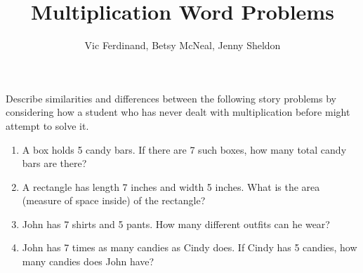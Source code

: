 \documentclass{ximera}
\title{Multiplication Word Problems}
\author{Vic Ferdinand, Betsy McNeal, Jenny Sheldon}
\begin{document}
\begin{abstract} \end{abstract}
\maketitle


\begin{problem}
Describe similarities and differences between the following story problems by considering how a student who has never dealt with multiplication before might attempt to solve it.
\begin{enumerate}
\item A box holds 5 candy bars.  If there are 7 such boxes, how many total candy bars are there?

\vfill

\item A rectangle has length 7 inches and width 5 inches.  What is the area (measure of space inside) of the rectangle?


\vfill


\item John has 7 shirts and 5 pants.  How many different outfits can he wear?


\vfill

\item John has 7 times as many candies as Cindy does.  If Cindy has 5 candies, how many candies does John have?

\vfill

\end{enumerate}
\end{problem}
\end{document}
